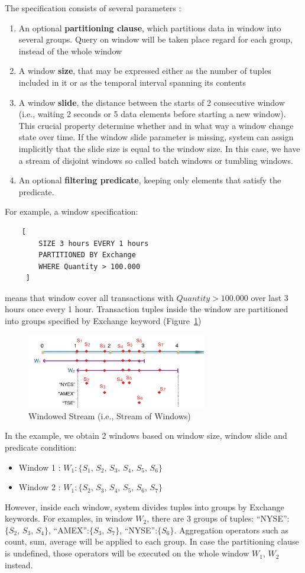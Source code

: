 The specification consists of several parameters :
\begin{enumerate}
\item An optional \textbf{partitioning clause}, which partitions data in window into several groups. Query on window will be taken place regard for each group, instead of the whole window
\item A window \textbf{size}, that may be expressed either as the number of tuples included in it or as the temporal interval spanning its contents
\item A window \textbf{slide}, the distance between the starts of 2 consecutive window (i.e., waiting 2 seconds or 5 data elements before starting a new window). This crucial property determine whether and in what way a window change state over time. If the window slide parameter is missing, system can  assign implicitly that the slide size is equal to the window size. In this case, we have a stream of disjoint windows so called batch windows or tumbling windows.
\item An optional \textbf{filtering predicate}, keeping only elements that satisfy the predicate.
\end{enumerate}

For example, a window specification:
\begin{lstlisting}
	[
		SIZE 3 hours EVERY 1 hours 
	 	PARTITIONED BY Exchange
	 	WHERE Quantity > 100.000
	 ]
\end{lstlisting}
means that window cover all transactions with $Quantity > 100.000$ over last 3 hours once every 1 hour. Transaction tuples inside the window are partitioned into groups specified by Exchange keyword (Figure~\ref{fig:winSpec})

\begin{figure}[htbp!] 
\centering    
\includegraphics[width=0.7\textwidth]{winSpec}
\caption[Windowed Stream]{Windowed Stream (i.e., Stream of Windows)}
\label{fig:winSpec}
\end{figure}

In the example, we obtain 2 windows based on window size, window slide and predicate condition: 
\begin{itemize}
	\item Window 1 : $W_1:\{S_1,\,S_2,\,S_3,\,S_4,\,S_5,\,S_6\}$
	\item Window 2 : $W_1:\{S_2,\,S_3,\,S_4,\,S_5,\,S_6,\,S_7\}$
\end{itemize}
However, inside each window, system divides tuples into groups by Exchange keywords. For examples, in window $W_2$, there are 3 groups of tuples: ``NYSE'':$\{S_2,\,S_3,\,S_4\}$, ``AMEX'':$\{S_3,\,S_7\}$, ``NYSE'':$\{S_6\}$. Aggregation operators such as count, sum, average will be applied to each group. In case the partitioning clause is undefined, those operators will be executed on the whole window $W_1$, $W_2$ instead.
 
